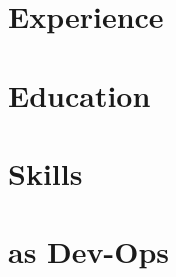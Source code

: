 \def\sitepage{professional}
\section{Experience}





\section{Education}







\clearpage



\section{Skills}
\begin{cvcolumns}
  
  
  
\end{cvcolumns}


\section{\textmd{as} Dev-Ops}

